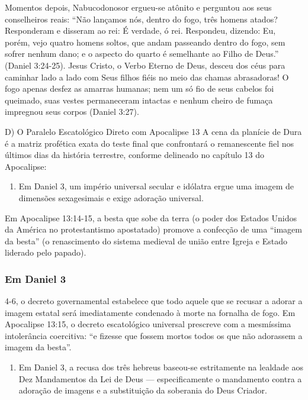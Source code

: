 \documentclass[11pt,a4paper,openany]{book}
\begin{document}
Momentos depois, Nabucodonosor ergueu-se atônito e perguntou aos seus conselheiros reais:
``Não lançamos nós, dentro do fogo, três homens atados? Responderam e disseram ao rei: É verdade, ó rei. Respondeu, dizendo: Eu, porém, vejo quatro homens soltos, que andam passeando dentro do fogo, sem sofrer nenhum dano; e o aspecto do quarto é semelhante ao Filho de Deus.'' (Daniel 3:24-25).
Jesus Cristo, o Verbo Eterno de Deus, desceu dos céus para caminhar lado a lado com Seus filhos fiéis no meio das chamas abrasadoras! O fogo apenas desfez as amarras humanas; nem um só fio de seus cabelos foi queimado, suas vestes permaneceram intactas e nenhum cheiro de fumaça impregnou seus corpos (Daniel 3:27).

D) O Paralelo Escatológico Direto com Apocalipse 13
A cena da planície de Dura é a matriz profética exata do teste final que confrontará o remanescente fiel nos últimos dias da história terrestre, conforme delineado no capítulo 13 do Apocalipse:

\begin{enumerate}
  \item Em Daniel 3, um império universal secular e idólatra ergue uma imagem de dimensões sexagesimais e exige adoração universal.
\end{enumerate}

Em Apocalipse 13:14-15, a besta que sobe da terra (o poder dos Estados Unidos da América no protestantismo apostatado) promove a confecção de uma ``imagem da besta'' (o renascimento do sistema medieval de união entre Igreja e Estado liderado pelo papado).

\subsubsection*{Em Daniel 3}
4-6, o decreto governamental estabelece que todo aquele que se recusar a adorar a imagem estatal será imediatamente condenado à morte na fornalha de fogo.
Em Apocalipse 13:15, o decreto escatológico universal prescreve com a mesmíssima intolerância coercitiva: ``e fizesse que fossem mortos todos os que não adorassem a imagem da besta''.
\begin{enumerate}
  \item Em Daniel 3, a recusa dos três hebreus baseou-se estritamente na lealdade aos Dez Mandamentos da Lei de Deus — especificamente o mandamento contra a adoração de imagens e a substituição da soberania do Deus Criador.
\end{enumerate}
\end{document}
